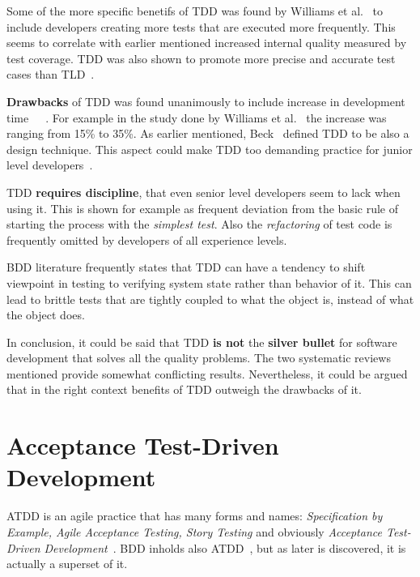     Some of the more specific benetifs of TDD was found by Williams et al.~\cite{williams2009effectiveness} to include developers
    creating more tests that are executed more frequently. This seems to correlate with earlier mentioned increased internal
    quality measured by test coverage. TDD was also shown to promote more precise and accurate test cases than TLD~\cite{williams2009effectiveness}.

    \textbf{Drawbacks} of TDD was found unanimously to include increase in development time~\cite{kollanus2010test}~\cite{bissi2016effects}~\cite{williams2009effectiveness}.
    For example in the study done by Williams et al.~\cite{williams2009effectiveness} the increase was ranging from 15\% to 35\%.
    As earlier mentioned, Beck~\cite{beck2001aim} defined TDD to be also a design technique. This aspect could make TDD too demanding practice for junior
    level developers~\cite{hammond2012test}.

    TDD \textbf{requires discipline}, that even senior level developers seem to lack when using it. This is shown for example as
    frequent deviation from the basic rule of starting the process with the \textit{simplest test}. Also the \textit{refactoring}
    of test code is frequently omitted by developers of all experience levels. ~\cite{aniche2010most}

    BDD literature frequently states that TDD can have a tendency to shift viewpoint in testing to verifying system state
    rather than behavior of it. This can lead to brittle tests that are tightly coupled to what the object is, instead of
    what the object does. ~\cite{chelimsky2010rspec}~\cite{astels2006new}~\cite{amodeo2015learning}

    In conclusion, it could be said that TDD \textbf{is not} the \textbf{silver bullet} for software development that solves all the quality problems.
    The two systematic reviews mentioned provide somewhat conflicting results. Nevertheless, it could be argued that in the right
    context benefits of TDD outweigh the drawbacks of it.

\section{Acceptance Test-Driven Development}
    ATDD is an agile practice that has many forms and names: \textit{Specification by Example, Agile Acceptance Testing, Story Testing} and
    obviously \textit{Acceptance Test-Driven Development}~\cite{gartner2012atdd}. BDD inholds also
    ATDD~\cite{gartner2012atdd}, but as later is discovered, it is actually a superset of it.

